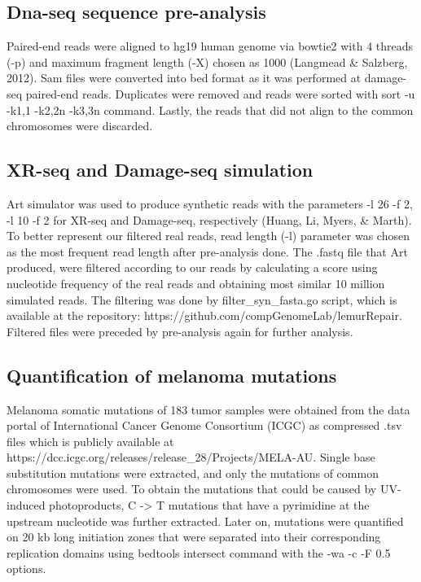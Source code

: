 \subsection{Dna-seq sequence pre-analysis}
Paired-end reads were aligned to hg19 human genome via bowtie2 with 4 threads (-p) and maximum fragment length (-X) chosen as 1000 (Langmead \& Salzberg, 2012). Sam files were converted into bed format as it was performed at damage-seq paired-end reads. Duplicates were removed and reads were sorted with sort -u -k1,1 -k2,2n -k3,3n command. Lastly, the reads that did not align to the common chromosomes were discarded.

\subsection{XR-seq and Damage-seq simulation}
Art simulator was used to produce synthetic reads with the parameters
-l 26 -f 2, -l 10 -f 2 for XR-seq and Damage-seq, respectively (Huang, Li, Myers, \& Marth). To better represent our filtered real reads, read length (-l) parameter was chosen as the most frequent read length after pre-analysis done. The .fastq file that Art produced, were filtered according to our reads by calculating a score using nucleotide frequency of the real reads and obtaining most similar 10 million simulated reads. 
The filtering was done by filter\_syn\_fasta.go script, which is available at the repository: https://github.com/compGenomeLab/lemurRepair. 
Filtered files were preceded by pre-analysis again for further analysis.

\subsection{Quantification of melanoma mutations}
Melanoma somatic mutations of 183 tumor samples were obtained from the data portal of International Cancer Genome Consortium (ICGC) as compressed .tsv files which is publicly available at https://dcc.icgc.org/releases/release\_28/Projects/MELA-AU. Single base substitution mutations were extracted, and only the mutations of common chromosomes were used. To obtain the mutations that could be caused by UV-induced photoproducts, C -> T mutations that have a pyrimidine at the upstream nucleotide was further extracted. Later on, mutations were quantified on 20 kb long initiation zones that were separated into their corresponding replication domains using bedtools intersect command with the -wa -c -F 0.5 options.

